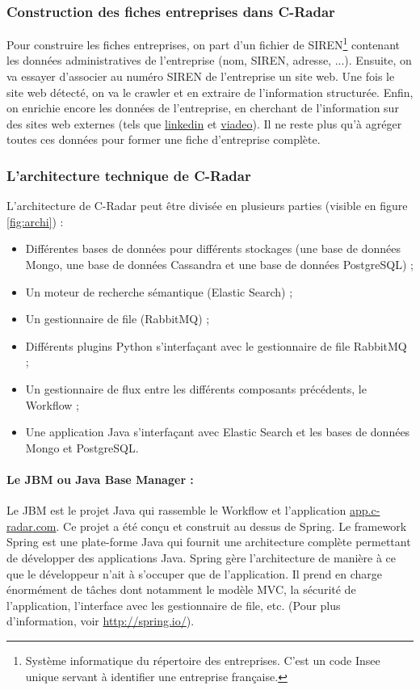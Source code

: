         \subsubsection{Construction des fiches entreprises dans C-Radar}
            Pour construire les fiches entreprises, on part d'un fichier de SIREN\footnote{Système informatique du répertoire des entreprises. C'est un code Insee unique servant à identifier une entreprise française.} contenant les données administratives de l'entreprise (nom, SIREN, adresse, ...). Ensuite, on va essayer d'associer au numéro SIREN de l'entreprise un site web. Une fois le site web détecté, on va le crawler et en extraire de l'information structurée. Enfin, on enrichie encore les données de l'entreprise, en cherchant de l'information sur des sites web externes (tels que \href{https://www.linkedin.com/}{linkedin} et \href{fr.viadeo.com/}{viadeo}). Il ne reste plus qu'à agréger toutes ces données pour former une fiche d'entreprise complète.

        \subsubsection{L'architecture technique de C-Radar}
        \label{subsub:archi_tech}
            L'architecture de C-Radar peut être divisée en plusieurs parties (visible en figure \ref{fig:archi}) :
            \begin{itemize}
                \item Différentes bases de données pour différents stockages (une base de données Mongo, une base de données Cassandra et une base de données PostgreSQL) ;
                \item Un moteur de recherche sémantique (Elastic Search) ;
                \item Un gestionnaire de file (RabbitMQ) ;
                \item Différents plugins Python s'interfaçant avec le gestionnaire de file RabbitMQ ;
                \item Un gestionnaire de flux entre les différents composants précédents, le Workflow ;
                \item Une application Java s'interfaçant avec Elastic Search et les bases de données Mongo et PostgreSQL.
            \end{itemize}

            \paragraph{Le JBM ou Java Base Manager :}
                Le JBM est le projet Java qui rassemble le Workflow et l'application \href{app.c-radar.com}{app.c-radar.com}. Ce projet a été conçu et construit au dessus de Spring. Le framework Spring est une plate-forme Java qui fournit une architecture complète permettant de développer des applications Java. Spring gère l'architecture de manière à ce que le développeur n'ait à s'occuper que de l'application. Il prend en charge énormément de tâches dont notamment le modèle MVC, la sécurité de l'application, l'interface avec les gestionnaire de file, etc. (Pour plus d'information, voir \href{http://spring.io/}{http://spring.io/}).

